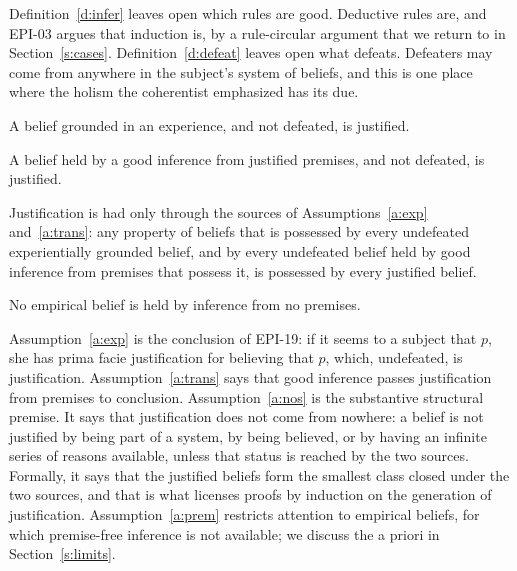 \documentclass{situationist-preprint}
\begin{document}
Definition~\ref{d:infer} leaves open which rules are good. Deductive rules are, and EPI-03 argues that induction is, by a rule-circular argument that we return to in Section~\ref{s:cases}. Definition~\ref{d:defeat} leaves open what defeats. Defeaters may come from anywhere in the subject's system of beliefs, and this is one place where the holism the coherentist emphasized has its due.

\begin{assumption}\label{a:exp}
A belief grounded in an experience, and not defeated, is justified.
\end{assumption}

\begin{assumption}[Transmission]\label{a:trans}
A belief held by a good inference from justified premises, and not defeated, is justified.
\end{assumption}

\begin{assumption}\label{a:nos}
Justification is had only through the sources of Assumptions~\ref{a:exp} and~\ref{a:trans}: any property of beliefs that is possessed by every undefeated experientially grounded belief, and by every undefeated belief held by good inference from premises that possess it, is possessed by every justified belief.
\end{assumption}

\begin{assumption}\label{a:prem}
No empirical belief is held by inference from no premises.
\end{assumption}

Assumption~\ref{a:exp} is the conclusion of EPI-19: if it seems to a subject that $p$, she has prima facie justification for believing that $p$, which, undefeated, is justification. Assumption~\ref{a:trans} says that good inference passes justification from premises to conclusion. Assumption~\ref{a:nos} is the substantive structural premise. It says that justification does not come from nowhere: a belief is not justified by being part of a system, by being believed, or by having an infinite series of reasons available, unless that status is reached by the two sources. Formally, it says that the justified beliefs form the smallest class closed under the two sources, and that is what licenses proofs by induction on the generation of justification. Assumption~\ref{a:prem} restricts attention to empirical beliefs, for which premise-free inference is not available; we discuss the a priori in Section~\ref{s:limits}.
\end{document}
